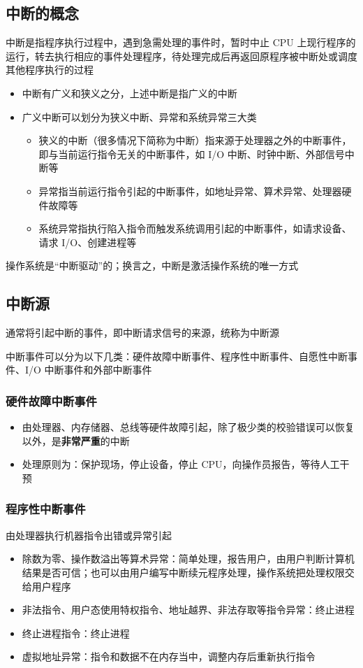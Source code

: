 \documentclass[cs4size,a4paper,10pt]{ctexart}
\begin{document}
	\subsection{中断的概念}
	中断是指程序执行过程中，遇到急需处理的事件时，暂时中止 CPU 上现行程序的运行，转去执行相应的事件处理程序，待处理完成后再返回原程序被中断处或调度其他程序执行的过程
	\begin{itemize}
		\item 中断有广义和狭义之分，上述中断是指广义的中断
		\item 广义中断可以划分为狭义中断、异常和系统异常三大类
		\begin{itemize}
			\item 狭义的中断（很多情况下简称为中断）指来源于处理器之外的中断事件，即与当前运行指令无关的中断事件，如 I/O 中断、时钟中断、外部信号中断等
			\item 异常指当前运行指令引起的中断事件，如地址异常、算术异常、处理器硬件故障等
			\item 系统异常指执行陷入指令而触发系统调用引起的中断事件，如请求设备、请求 I/O、创建进程等
		\end{itemize}
	\end{itemize}
	操作系统是“中断驱动”的；换言之，中断是激活操作系统的唯一方式


	\subsection{中断源}
	通常将引起中断的事件，即中断请求信号的来源，统称为中断源

	中断事件可以分为以下几类：硬件故障中断事件、程序性中断事件、自愿性中断事件、I/O 中断事件和外部中断事件

	\subsubsection{硬件故障中断事件}
	\begin{itemize}
		\item 由处理器、内存储器、总线等硬件故障引起，除了极少类的校验错误可以恢复以外，是\textbf{非常严重}的中断
		\item 处理原则为：保护现场，停止设备，停止 CPU，向操作员报告，等待人工干预
	\end{itemize}


	\subsubsection{程序性中断事件}
	由处理器执行机器指令出错或异常引起
	\begin{itemize}
		\item 除数为零、操作数溢出等算术异常：简单处理，报告用户，由用户判断计算机结果是否可信；也可以由用户编写中断续元程序处理，操作系统把处理权限交给用户程序
		\item 非法指令、用户态使用特权指令、地址越界、非法存取等指令异常：终止进程
		\item 终止进程指令：终止进程
		\item 虚拟地址异常：指令和数据不在内存当中，调整内存后重新执行指令
	\end{itemize}
\end{document}
